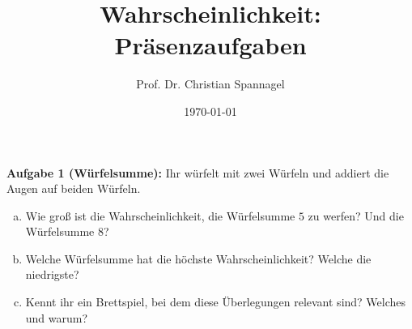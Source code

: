 \documentclass{../cssheet}
\title{Wahrscheinlichkeit: Präsenzaufgaben}
\author{Prof. Dr. Christian Spannagel}
\date{\today}
\begin{document}
\printtitle

\vspace*{10mm}

\textbf{Aufgabe 1 (Würfelsumme):} Ihr würfelt mit zwei Würfeln und addiert die Augen auf beiden Würfeln. 

\begin{enumerate}[a)]
\item Wie groß ist die Wahrscheinlichkeit, die Würfelsumme $5$ zu werfen? Und die Würfelsumme $8$?
\item Welche Würfelsumme hat die höchste Wahrscheinlichkeit? Welche die niedrigste?
\item  Kennt ihr ein Brettspiel, bei dem diese Überlegungen relevant sind? Welches und warum?
\end{enumerate}


\vspace*{3cm}

\printlicense

\printsocials
\end{document}
